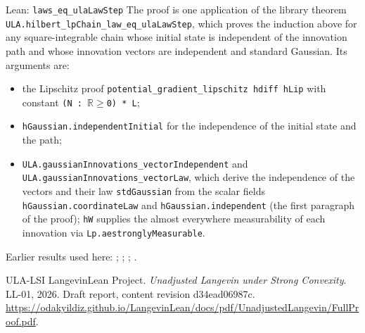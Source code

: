 \documentclass[11pt,a4paper]{article}
\begin{document}
\begin{leanbox}{Lean: \texttt{laws\_\allowbreak{}eq\_\allowbreak{}ulaLawStep}}
The proof is one application of the library theorem \texttt{ULA.\allowbreak{}hilbert\_\allowbreak{}lp\allowbreak{}Chain\_\allowbreak{}law\_\allowbreak{}eq\_\allowbreak{}ula\allowbreak{}Law\allowbreak{}Step}, which proves the induction above for any square-integrable chain whose initial state is independent of the innovation path and whose innovation vectors are independent and standard Gaussian. Its arguments are:



\begin{itemize}


\item the Lipschitz proof \texttt{potential\_\allowbreak{}gradient\_\allowbreak{}lipschitz hdiff h\allowbreak{}Lip} with constant \texttt{(N : \ensuremath{\mathbb R}\ensuremath{\ge}0) * L};

\item \texttt{h\allowbreak{}Gaussian.\allowbreak{}independent\allowbreak{}Initial} for the independence of the initial state and the path;

\item \texttt{ULA.\allowbreak{}gaussian\allowbreak{}Innovations\_\allowbreak{}vector\allowbreak{}Independent} and \texttt{ULA.\allowbreak{}gaussian\allowbreak{}Innovations\_\allowbreak{}vector\allowbreak{}Law}, which derive the independence of the vectors and their law \texttt{std\allowbreak{}Gaussian} from the scalar fields \texttt{h\allowbreak{}Gaussian.\allowbreak{}coordinate\allowbreak{}Law} and \texttt{h\allowbreak{}Gaussian.\allowbreak{}independent} (the first paragraph of the proof); \texttt{h\allowbreak{}W} supplies the almost everywhere measurability of each innovation via \texttt{Lp.\allowbreak{}aestrongly\allowbreak{}Measurable}.

\end{itemize}
\end{leanbox}


Earlier results used here: \cite[Section~3.36.7]{LangevinLean2026ULASC}; \cite[Section~3.41.2]{LangevinLean2026ULASC}; \cite[Section~3.41.3]{LangevinLean2026ULASC}; \cite[Section~3.42.2]{LangevinLean2026ULASC}.

\begin{thebibliography}{ULA-LSI}
LangevinLean Project. \emph{Unadjusted Langevin under Strong Convexity}. LL-01, 2026. Draft report, content revision d34ead06987c. \url{https://odakyildiz.github.io/LangevinLean/docs/pdf/UnadjustedLangevin/FullProof.pdf}.
\end{thebibliography}
\end{document}

